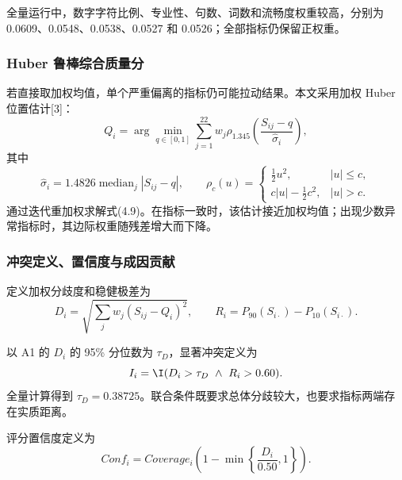 \documentclass[bwprint]{gmcmthesis}
\begin{document}
        全量运行中，数字字符比例、专业性、句数、词数和流畅度权重较高，分别为 0.0609、0.0548、0.0538、0.0527 和 0.0526；全部指标仍保留正权重。

        
        \subsubsection{Huber 鲁棒综合质量分}   %
        若直接取加权均值，单个严重偏离的指标仍可能拉动结果。本文采用加权 Huber 位置估计[3]：
        \begin{equation}
        Q_i=\arg\min_{q\in[0,1]}\sum_{j=1}^{22}w_j
        \rho_{1.345}\!\left(\frac{S_{ij}-q}{\widehat\sigma_i}\right),
        \label{eq:huberq}
        \end{equation}
        其中
        \begin{equation}
        \widehat\sigma_i=1.4826\operatorname{median}_{j}|S_{ij}-q|,
        \qquad
        \rho_c(u)=\begin{cases}
        \tfrac12u^2,&|u|\le c,\\
        c|u|-\tfrac12c^2,&|u|>c.
        \end{cases}
        \label{eq:huber}
        \end{equation}
        通过迭代重加权求解式(4.9)。在指标一致时，该估计接近加权均值；出现少数异常指标时，其边际权重随残差增大而下降。

        
        \subsubsection{冲突定义、置信度与成因贡献}   %
        定义加权分歧度和稳健极差为
        \begin{equation}
        D_i=\sqrt{\sum_jw_j(S_{ij}-Q_i)^2},\qquad
        R_i=P_{90}(S_{i\cdot})-P_{10}(S_{i\cdot}).
        \label{eq:disagreement}
        \end{equation}
        
        以 A1 的 $D_i$ 的 95\% 分位数为 $\tau_D$，显著冲突定义为
        \begin{equation}
        I_i=\I(D_i>\tau_D\ \land\ R_i>0.60).
        \label{eq:conflict}
        \end{equation}
        全量计算得到 $\tau_D=0.38725$。联合条件既要求总体分歧较大，也要求指标两端存在实质距离。
        
        评分置信度定义为
        \begin{equation}
        Conf_i=Coverage_i\left(1-\min\left\{\frac{D_i}{0.50},1\right\}\right).
        \label{eq:confidence}
        \end{equation}
        
\end{document}
